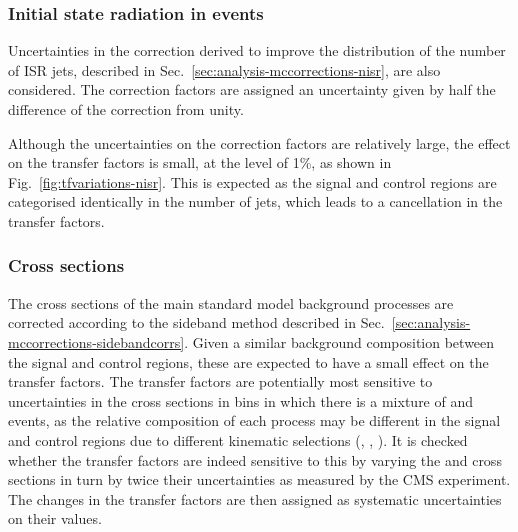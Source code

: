 
\subsubsection{Initial state radiation in \ttbar events}
Uncertainties in the correction derived to improve the distribution of the 
number of ISR jets, described in Sec.~\ref{sec:analysis-mccorrections-nisr}, 
are also considered. The correction factors are assigned an uncertainty given 
by half the difference of the correction from unity.

Although the uncertainties on the correction factors are relatively large, the 
effect on the transfer factors is small, at the level of 1\%, as shown in 
Fig.~\ref{fig:tfvariations-nisr}. This is expected as the signal and control 
regions are categorised identically in the number of jets, which leads to a 
cancellation in the transfer factors.

\subsubsection{Cross sections}
The cross sections of the main standard model background processes are 
corrected according to the \mht sideband method described in 
Sec.~\ref{sec:analysis-mccorrections-sidebandcorrs}. Given a similar background 
composition between the signal and control regions, these are expected to have 
a small effect on the transfer factors. The \Tmutottw transfer factors are 
potentially most sensitive to uncertainties in the cross sections in bins in 
which there is a mixture of \wlj and \ttbar events, as the relative composition 
of each process may be different in the signal and control regions due to 
different kinematic selections (\alphat, \bdphi, \mt). It is checked whether 
the transfer factors are indeed sensitive to this by varying the \wj and \ttbar 
cross sections in turn by twice their uncertainties as measured by the CMS 
experiment.
The changes in the transfer factors are then assigned as systematic 
uncertainties on their values.

